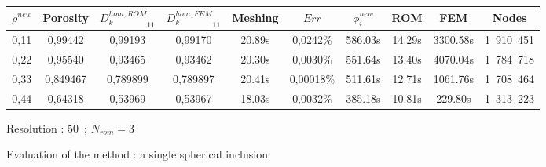 \begin{figure}[H]%
%
\begin{center}
\begin{tabular}{|c|c||c|c||c|c||c|c||c||c|}
\hline
\rowcolor{lightgray} $\rho^{new}$&Porosity&${D_k^{hom,ROM}}_{11}$&${D_k^{hom,FEM}}_{11}$&Meshing&$Err$&$\phi_i^{new}$&ROM&FEM&Nodes\\
\hline
0,11&0,99442&0,99193&0,99170&20.89s&0,0242\%&586.03s&14.29s&3300.58s&1\ 910\ 451\\
\hline
0,22&0,95540&0,93465&0,93462&20.30s&0,0030\%&551.64s&13.40s&4070.04s&1\ 784\ 718\\
\hline
0,33&0,849467&0,789899&0,789897&20.41s&0,00018\%&511.61s&12.71s&1061.76s&1\ 708\ 464\\
\hline
0,44&0,64318&0,53969&0,53967&18.03s&0,0032\%&385.18s&10.81s&229.80s&1\ 313\ 223\\
\hline
\end{tabular}
\end{center}
\caption{Resolution : $50$\ ; $N_{rom}=3$}
%
\end{figure}

\ligneinter

\begin{figure}[H]%
%
\begin{table}[H]
\begin{center}
%
%
\qquad
{}%
%
\end{center}
\end{table}
%
\caption{Evaluation of the method : a single spherical inclusion}
\end{figure}

